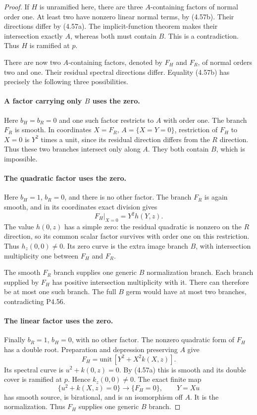 \begin{proof}
If $H$ is unramified here, there are three
$A$-containing factors of normal order one. At least
two have nonzero linear normal terms, by (4.57b).
Their directions differ by (4.57a). The implicit-function
theorem makes their intersection exactly $A$, whereas
both must contain $B$. This is a contradiction.
Thus $H$ is ramified at $p$.

There are now two $A$-containing factors, denoted by
$F_H$ and $F_R$, of normal orders two and one. Their
residual spectral directions differ. Equality (4.57b)
has precisely the following three possibilities.

\paragraph{A factor carrying only $B$ uses the zero.}
Here $b_H=b_R=0$ and one such factor restricts to $A$
with order one. The branch $F_R$ is smooth. In coordinates
$X=F_R$, $A=\{X=Y=0\}$, restriction of $F_H$ to $X=0$
is $Y^2$ times a unit, since its residual direction
differs from the $R$ direction. Thus these two branches
intersect only along $A$. They both contain $B$, which
is impossible.

\paragraph{The quadratic factor uses the zero.}
Here $b_H=1$, $b_R=0$, and there is no other factor.
The branch $F_R$ is again smooth, and in its coordinates
exact division gives
\[
                         F_H|_{X=0}=Y^2h(Y,z).
\]
The value $h(0,z)$ has a simple zero: the residual
quadratic is nonzero on the $R$ direction, so its
common scalar factor survives with order one on this
restriction. Thus $h_z(0,0)\ne0$. Its zero curve is the
extra image branch $B$, with intersection multiplicity
one between $F_H$ and $F_R$.

The smooth $F_R$ branch supplies one generic $B$
normalization branch. Each branch supplied by $F_H$
has positive intersection multiplicity with it. There
can therefore be at most one such branch. The full
$B$ germ would have at most two branches, contradicting
P4.56.

\paragraph{The linear factor uses the zero.}
Finally $b_R=1$, $b_H=0$, with no other factor.
The nonzero quadratic form of $F_H$ has a double root.
Preparation and depression preserving $A$ give
\[
                   F_H=\text{unit}\,[Y^2+X^2k(X,z)].
\]
Its spectral curve is $u^2+k(0,z)=0$. By (4.57a) this
is smooth and its double cover is ramified at $p$.
Hence $k_z(0,0)\ne0$. The exact finite map
\[
 \{u^2+k(X,z)=0\}\longrightarrow\{F_H=0\},
                         \qquad Y=Xu
\]
has smooth source, is birational, and is an isomorphism
off $A$. It is the normalization. Thus $F_H$ supplies
one generic $B$ branch.


\end{proof}
